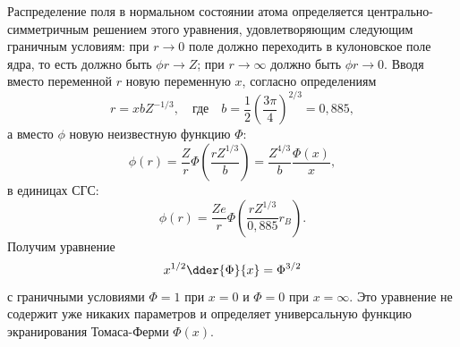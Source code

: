 \documentclass[10pt]{hedlab}
\begin{document}
  Распределение поля в нормальном состоянии атома определяется
  центрально-симметричным решением этого уравнения, удовлетворяющим следующим
  граничным условиям: при \( r \to 0 \) поле должно переходить в кулоновское
  поле ядра, то есть должно быть \( \phi r \to Z \); при \( r \to \infty \)
  должно быть \( \phi r \to 0 \). Вводя вместо переменной \( r \) новую
  переменную \( x \), согласно определениям
  \begin{equation}
    r = xbZ^{-1 / 3}, \quad\text{где}\quad b = \frac{1}{2} \left(
      \frac{3\pi}{4} \right)^{2 / 3} = 0,\!885,
    \label{eq:5}
  \end{equation}
  а вместо \( \phi \) новую неизвестную функцию \( \Phi \):
  \begin{equation}
    \phi(r) = \frac{Z}{r} \Phi \left( \frac{rZ^{1 / 3}}{b} \right) =
      \frac{Z^{4 / 3}}{b} \frac{\Phi(x)}{x},
    \label{eq:6}
  \end{equation}
  в единицах СГС:
  \[
    \phi(r) = \frac{Ze}{r} \Phi \left( \frac{rZ^{1 / 3}}{0,\!885}r_B \right).
  \]
  Получим уравнение
  \begin{equation}
    x^{1 / 2} \dder{\Phi}{x} = \Phi^{3 / 2}
    \label{eq:7}
  \end{equation}
  с граничными условиями \( \Phi = 1 \) при \( x = 0 \) и \( \Phi = 0 \) при
  \( x = \infty \). Это уравнение не содержит уже никаких параметров и
  определяет универсальную функцию экранирования Томаса-Ферми \( \Phi(x) \).
\end{document}
